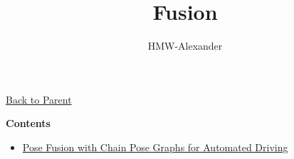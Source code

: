 \documentclass[letterpaper,11pt]{article}
\title{\textbf{Fusion}}
\author{HMW-Alexander}
\begin{document}
\maketitle

\href{../index.html}{Back to Parent}

\textbf{Contents}
\begin{itemize}
	\item \href{./Pose_Fusion_with_Chain_Pose_Graphs_for_Automated_Driving/document.html}{Pose Fusion with Chain Pose Graphs for Automated Driving}
\end{itemize}
	
\end{document}
